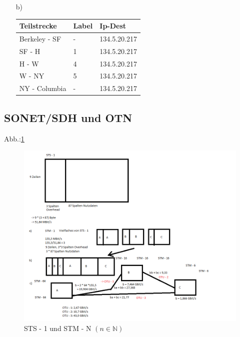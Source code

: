 \begin{itemize}
	\item[b)] 
	\begin{tabularx}{\textwidth}{|X|X|X|}
	\hline
	Teilstrecke	&Label	&Ip-Dest \\
	\hline
	Berkeley - SF	&-	&134.5.20.217 \\
	\hline
	SF - H		&1	&134.5.20.217 \\
	\hline
	H - W		&4	&134.5.20.217\\
	\hline
	W - NY		&5	&134.5.20.217 \\
	\hline
	NY - Columbia	&-	&134.5.20.217 \\
	\hline
\end{tabularx}
\end{itemize}
\subsection{SONET/SDH und OTN}
Abb.:\ref{img:SONET}
\begin{figure}
		\centering
		\includegraphics[width = 16cm]{./Rechnernetze/Images/4_5abc.png}
		\caption{STS - 1 und STM - N \((n \in \mathbb N)\)}
		\label{img:SONET}
\end{figure}